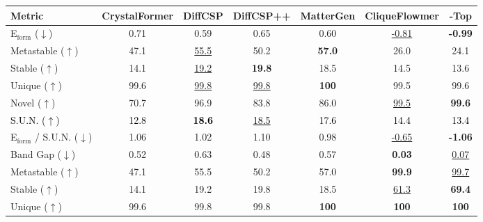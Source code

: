 \documentclass{article}
\theoremstyle{plain}
\theoremstyle{definition}
\theoremstyle{remark}
\begin{document}
\begin{table}[t]
    \centering
    {\small
    \setlength{\tabcolsep}{4pt}
    \begin{tabular}{l|cccc|cc}
        \toprule
        Metric & CrystalFormer & DiffCSP & DiffCSP++ & MatterGen & \textbf{CliqueFlowmer} & \textbf{-Top} \\
        \midrule
        E$_{\text{form}}$ ($\downarrow$) 
        & 0.71 
        & 0.59
        & 0.65 
        & 0.60 
        & \underline{-0.81}
        & \textbf{-0.99} \\
        Metastable ($\uparrow$)
        & 47.1
        & \underline{55.5}
        & 50.2
        & \textbf{57.0}
        & 26.0
        & 24.1 \\
        Stable ($\uparrow$)
        & 14.1
        & \underline{19.2}
        & \textbf{19.8}
        & 18.5
        & 14.5
        & 13.6 \\
        Unique ($\uparrow$)
        & 99.6
        & \underline{99.8}
        & \underline{99.8}
        & \textbf{100}
        & 99.5
        & 99.6 \\
        Novel ($\uparrow$)
        & 70.7
        & 96.9
        & 83.8
        & 86.0
        & \underline{99.5}
        & \textbf{99.6} \\
        \textcolor{black}{S.U.N. ($\uparrow$)}  
        & \textcolor{black}{12.8}
        & \textcolor{black}{\textbf{18.6}}
        & \textcolor{black}{\underline{18.5}}
        & \textcolor{black}{17.6}
        & \textcolor{black}{14.4}
        & \textcolor{black}{13.4} \\
        E$_{\text{form}}$ / S.U.N. ($\downarrow$) 
        & 1.06 
        & 1.02 
        & 1.10 
        & 0.98 
        & \underline{-0.65}
        & \textbf{-1.06} \\
        \midrule
        Band Gap ($\downarrow$) 
        & 0.52 
        & 0.63 
        & 0.48 
        & 0.57 
        & \textbf{0.03} 
        & \underline{0.07} \\
        Metastable ($\uparrow$)
        & 47.1
        & 55.5
        & 50.2
        & 57.0
        & \textbf{99.9}
        & \underline{99.7} \\
        Stable ($\uparrow$)
        & 14.1
        & 19.2
        & 19.8
        & 18.5
        & \underline{61.3}
        & \textbf{69.4} \\
        Unique ($\uparrow$)
        & 99.6
        & 99.8
        & 99.8
        & \textbf{100}
        & \textbf{100}
        & \textbf{100} \\

\end{tabular}}
\end{table}
\end{document}
